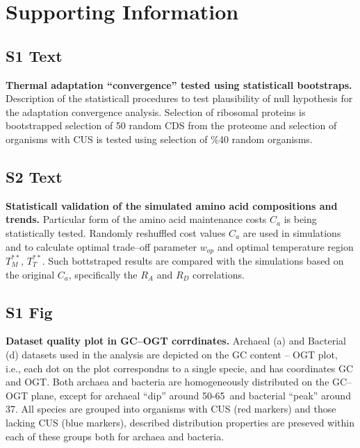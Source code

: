 \documentclass[10pt,letterpaper]{article}
\begin{document}





\section*{Supporting Information}

\subsection*{S1 Text}
\label{text:s1}
{\bf Thermal adaptation ``convergence'' tested using statisticall bootstraps.}
Description of the statisticall procedures to test plausibility of null hypothesis for the adaptation convergence analysis. Selection of ribosomal proteins is bootstrapped selection of 50 random CDS from the proteome and selection of organisms with CUS is tested using selection of \%40 random organisms.


\subsection*{S2 Text}
\label{text:s2}
{\bf Statisticall validation of the simulated amino acid compositions and trends.}
Particular form of the amino acid maintenance costs $C_{a}$ is being statistically tested.
Randomly reshuffled cost values $C_{a}$ are used in simulations and to calculate optimal trade--off parameter $w_{op}$ and optimal temperature region $T^{**}_M$, $T^{**}_T$. Such bottstraped results are compared with the simulations based on the original $C_{a}$, specifically the $R_A$ and $R_D$ correlations.



\subsection*{S1 Fig}
\label{fig:s1}
{\bf Dataset quality plot in GC--OGT corrdinates.}
Archaeal (a) and Bacterial (d) datasets used in the analysis are depicted on the GC content -- OGT plot, i.e., each dot on the plot correspondns to a single specie, and has coordinates GC and OGT. Both archaea and bacteria are homogeneously distributed on the GC--OGT plane, except for archaeal ``dip'' around 50-65\textcelsius\  and bacterial ``peak'' around 37\textcelsius. All species are grouped into organisms with CUS (red markers) and those lacking CUS (blue markers), described distribution properties are preseved within each of these groups both for archaea and bacteria.
\end{document}
